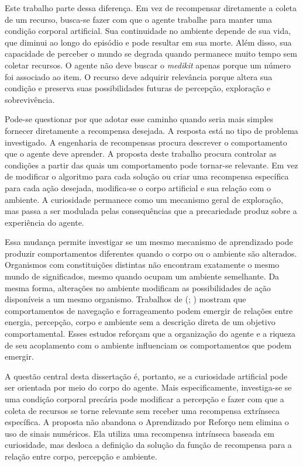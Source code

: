 Este trabalho parte dessa diferença. Em vez de recompensar diretamente a coleta de um recurso, busca-se fazer com que o agente trabalhe para manter uma condição corporal artificial. Sua continuidade no ambiente depende de sua vida, que diminui ao longo do episódio e pode resultar em sua morte. Além disso, sua capacidade de perceber o mundo se degrada quando permanece muito tempo sem coletar recursos. O agente não deve buscar o \textit{medikit} apenas porque um número foi associado ao item. O recurso deve adquirir relevância porque altera sua condição e preserva suas possibilidades futuras de percepção, exploração e sobrevivência.

Pode-se questionar por que adotar esse caminho quando seria mais simples fornecer diretamente a recompensa desejada. A resposta está no tipo de problema investigado. A engenharia de recompensas procura descrever o comportamento que o agente deve aprender. A proposta deste trabalho procura controlar as condições a partir das quais um comportamento pode tornar-se relevante. Em vez de modificar o algoritmo para cada solução ou criar uma recompensa específica para cada ação desejada, modifica-se o corpo artificial e sua relação com o ambiente. A curiosidade permanece como um mecanismo geral de exploração, mas passa a ser modulada pelas consequências que a precariedade produz sobre a experiência do agente.

Essa mudança permite investigar se um mesmo mecanismo de aprendizado pode produzir comportamentos diferentes quando o corpo ou o ambiente são alterados. Organismos com constituições distintas não encontram exatamente o mesmo mundo de significados, mesmo quando ocupam um ambiente semelhante. Da mesma forma, alterações no ambiente modificam as possibilidades de ação disponíveis a um mesmo organismo. Trabalhos de  (\citeyear{yuri-ambiente-rico}; \citeyear{yuri-sem-objetivo}) mostram que comportamentos de navegação e forrageamento podem emergir de relações entre energia, percepção, corpo e ambiente sem a descrição direta de um objetivo comportamental. Esses estudos reforçam que a organização do agente e a riqueza de seu acoplamento com o ambiente influenciam os comportamentos que podem emergir.

A questão central desta dissertação é, portanto, se a curiosidade artificial pode ser orientada por meio do corpo do agente. Mais especificamente, investiga-se se uma condição corporal precária pode modificar a percepção e fazer com que a coleta de recursos se torne relevante sem receber uma recompensa extrínseca específica. A proposta não abandona o Aprendizado por Reforço nem elimina o uso de sinais numéricos. Ela utiliza uma recompensa intrínseca baseada em curiosidade, mas desloca a definição da solução da função de recompensa para a relação entre corpo, percepção e ambiente.

